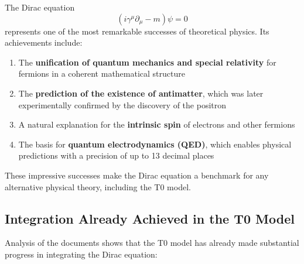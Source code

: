 \documentclass[12pt,a4paper]{article}
\begin{document}
	The Dirac equation 
	\begin{equation}
		(i\gamma^\mu \partial_\mu - m)\psi = 0
	\end{equation}
	represents one of the most remarkable successes of theoretical physics. Its achievements include:
	
	\begin{enumerate}
		\item The \textbf{unification of quantum mechanics and special relativity} for fermions in a coherent mathematical structure
		
		\item The \textbf{prediction of the existence of antimatter}, which was later experimentally confirmed by the discovery of the positron
		
		\item A natural explanation for the \textbf{intrinsic spin} of electrons and other fermions
		
		\item The basis for \textbf{quantum electrodynamics (QED)}, which enables physical predictions with a precision of up to 13 decimal places
	\end{enumerate}
	
	These impressive successes make the Dirac equation a benchmark for any alternative physical theory, including the T0 model.
	
	\subsection{Integration Already Achieved in the T0 Model}
	\label{subsec:dirac_integration}
	
	Analysis of the documents shows that the T0 model has already made substantial progress in integrating the Dirac equation:
	
\end{document}
